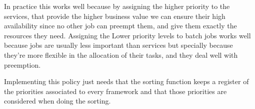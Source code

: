 \documentclass{report}                     %
\begin{document}
In practice this works well because by assigning the higher priority
to the services, that provide the higher business value  we can
ensure their high availability since no other job can preempt them,
and give them exactly the resources they need. Assigning the Lower
priority levels to batch jobs works well because jobs are usually less
important than services but specially because they're more flexible in
the allocation of their tasks, and they deal well with preemption.

Implementing this policy just needs that the sorting function keeps a
register of the priorities associated to every framework and that
those priorities are considered when doing the sorting.




\end{document}
